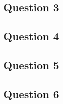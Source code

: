 \documentclass[12pt]{report}
\begin{document}
\subsection{Question 3}

\subsection{Question 4}

\subsection{Question 5}

\subsection{Question 6}
\end{document}
